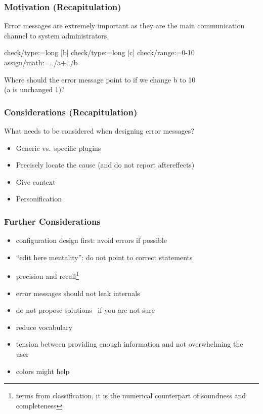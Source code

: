 \begin{frame}[fragile]
	\frametitle{Motivation (Recapitulation)}

	Error messages are extremely important as they are the main communication channel to system administrators.\\
	\vspace{0.5em}

	\begin{code}[morekeywords={assign,math},gobble=4]
	[a]
	  check/type:=long
	[b]
	  check/type:=long
	[c]
	  check/range:=0-10
	  assign/math:=../a+../b
	\end{code}

	\begin{task}
	Where should the error message point to if we change b to 10 \\ (a is unchanged 1)?
	\end{task}
\end{frame}

\begin{frame}
	\frametitle{Considerations (Recapitulation)}

	\begin{task}
	What needs to be considered when designing error messages?
	\end{task}

	\begin{itemize} %
	\item Generic vs.\ specific plugins
	\item Precisely locate the cause (and do not report aftereffects)
	\item Give context
	\item Personification~\cite{lee2011personifying}
	\end{itemize}
\end{frame}

\begin{frame}
	\frametitle{Further Considerations}

	\begin{itemize}[<+-| alert@+>]
	\item configuration design first: avoid errors if possible
	\item ``edit here mentality'': do not point to correct statements~\cite{marceau2011mind}
	\item precision and recall\footnote{terms from classification, it is the numerical counterpart of soundness and completeness}~\cite{wrenn2017error}
	\item error messages should not leak internals~\cite{brown1983error}
	\item do not propose solutions~\cite{marceau2011mind} if you are not sure
	\item reduce vocabulary~\cite{marceau2011mind}
	\item tension between providing enough information and not overwhelming the user~\cite{wrenn2017error}
	\item colors might help~\cite{wrenn2017error}
	\end{itemize}
\end{frame}

